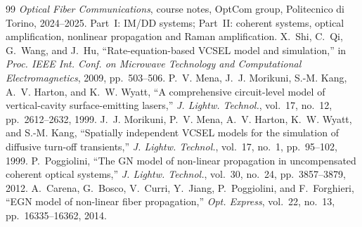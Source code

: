 \begin{thebibliography}{99}
 \emph{Optical Fiber Communications}, course notes, OptCom group, Politecnico di Torino, 2024--2025. Part~I: IM/DD systems; Part~II: coherent systems, optical amplification, nonlinear propagation and Raman amplification.
 X.~Shi, C.~Qi, G.~Wang, and J.~Hu, ``Rate-equation-based VCSEL model and simulation,'' in \emph{Proc. IEEE Int. Conf. on Microwave Technology and Computational Electromagnetics}, 2009, pp.~503--506.
 P.~V. Mena, J.~J. Morikuni, S.-M. Kang, A.~V. Harton, and K.~W. Wyatt, ``A comprehensive circuit-level model of vertical-cavity surface-emitting lasers,'' \emph{J. Lightw. Technol.}, vol.~17, no.~12, pp.~2612--2632, 1999.
 J.~J. Morikuni, P.~V. Mena, A.~V. Harton, K.~W. Wyatt, and S.-M. Kang, ``Spatially independent VCSEL models for the simulation of diffusive turn-off transients,'' \emph{J. Lightw. Technol.}, vol.~17, no.~1, pp.~95--102, 1999.
 P.~Poggiolini, ``The GN model of non-linear propagation in uncompensated coherent optical systems,'' \emph{J. Lightw. Technol.}, vol.~30, no.~24, pp.~3857--3879, 2012.
 A.~Carena, G.~Bosco, V.~Curri, Y.~Jiang, P.~Poggiolini, and F.~Forghieri, ``EGN model of non-linear fiber propagation,'' \emph{Opt. Express}, vol.~22, no.~13, pp.~16335--16362, 2014.

\end{thebibliography}
